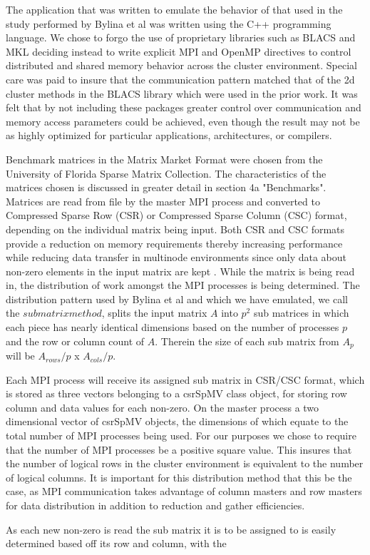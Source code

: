 The application that was written to emulate the behavior of that used in the study performed by Bylina et al was written using the C++ programming language.
We chose to forgo the use of proprietary libraries such as BLACS and MKL deciding instead to write explicit MPI and OpenMP directives to control distributed and shared memory behavior across the cluster environment. 
Special care was paid to insure that the communication pattern matched that of the 2d cluster methods in the BLACS library which were used in the prior work.
It was felt that by not including these packages greater control over communication and memory access parameters could be achieved, even though the result may not be as highly optimized for particular applications, architectures, or compilers. 


Benchmark matrices in the Matrix Market Format were chosen from the University of Florida Sparse Matrix Collection. The characteristics of the matrices chosen is discussed in greater detail in section 4a "Benchmarks". 
Matrices are read from file by the master MPI process and converted to Compressed Sparse Row (CSR) or Compressed Sparse Column (CSC) format, depending on the individual matrix being input.
Both CSR and CSC formats provide a reduction on memory requirements thereby increasing performance while reducing data transfer in multinode environments since only data about non-zero elements in the input matrix are kept . 
While the matrix is being read in, the distribution of work amongst the MPI processes is being determined. 
The distribution pattern used by Bylina et al and which we have emulated, we call the $sub matrix method$, splits the input matrix $A$ into $p^2$ sub matrices in which each piece has nearly identical dimensions based on the number of processes $p$ and the row or column count of $A$.
Therein the size of each sub matrix from $A_p$ will be $A_{rows}/p$  x $A_{cols}/p$.


Each MPI process will receive its assigned sub matrix in CSR/CSC format, which is stored as three vectors belonging to a csrSpMV class object, for storing row column and data values for each non-zero. 
On the master process a two dimensional vector of csrSpMV objects, the dimensions of which equate to the total number of MPI processes being used. 
For our purposes we chose to require that the number of MPI processes be a positive square value. 
This insures that the number of logical rows in the cluster environment is equivalent to the number of logical columns. 
It is important for this distribution method that this be the case, as MPI communication takes advantage of column masters and row masters for data distribution in addition to reduction and gather efficiencies. 


As each new non-zero is read the sub matrix it is to be assigned to is easily determined based off its row and column, with the 


